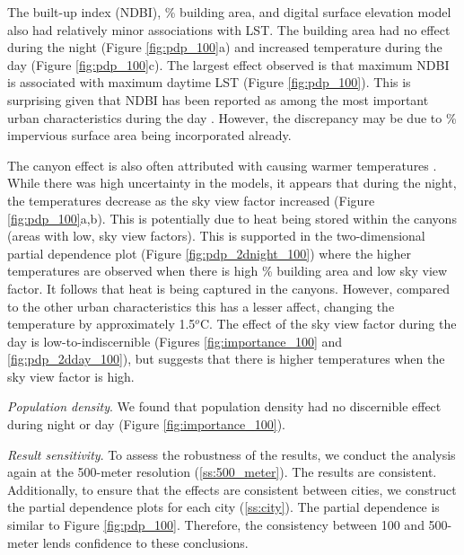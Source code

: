 \documentclass[final,3p,times,twocolumn,sort&compress]{elsarticle}
\begin{document}
The built-up index (NDBI), \% building area, and digital surface elevation model also had relatively minor associations with LST.
The building area had no effect during the night (Figure \ref{fig:pdp_100}a) and increased temperature during the day (Figure \ref{fig:pdp_100}c).
The largest effect observed is that maximum NDBI is associated with maximum daytime LST (Figure \ref{fig:pdp_100}).
This is surprising given that NDBI has been reported as among the most important urban characteristics during the day \cite{Peng2018-cp}.
However, the discrepancy may be due to \% impervious surface area being incorporated already.

The canyon effect is also often attributed with causing warmer temperatures \cite{Chun2017-mm,Oke1988-re}.
While there was high uncertainty in the models, it appears that during the night, the temperatures decrease as the sky view factor increased (Figure \ref{fig:pdp_100}a,b).
This is potentially due to heat being stored within the canyons (areas with low, sky view factors).
This is supported in the two-dimensional partial dependence plot (Figure \ref{fig:pdp_2dnight_100}) where the higher temperatures are observed when there is high \% building area and low sky view factor.
It follows that heat is being captured in the canyons. 
However, compared to the other urban characteristics this has a lesser affect, changing the temperature by approximately 1.5$^o$C.
The effect of the sky view factor during the day is low-to-indiscernible (Figures \ref{fig:importance_100} and \ref{fig:pdp_2dday_100}), but suggests that there is higher temperatures when the sky view factor is high.

\textit{Population density}.
We found that population density had no discernible effect during night or day (Figure \ref{fig:importance_100}).

\textit{Result sensitivity}.
To assess the robustness of the results, we conduct the analysis again at the 500-meter resolution (\ref{ss:500_meter}).
The results are consistent.
Additionally, to ensure that the effects are consistent between cities, we construct the partial dependence plots for each city (\ref{ss:city}).
The partial dependence is similar to Figure \ref{fig:pdp_100}.
Therefore, the consistency between 100 and 500-meter lends confidence to these conclusions.
\end{document}
